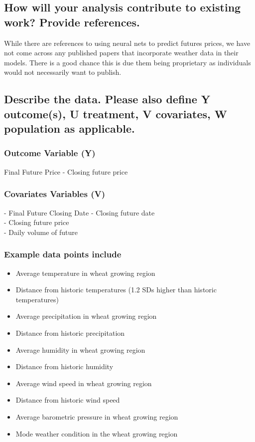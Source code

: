 \documentclass[twoside,11pt]{article}
\begin{document}
\subsection{How will your analysis contribute to existing work? Provide references.}

While there are references to using neural nets to predict futures prices, we have not come across any published papers that incorporate weather data in their models.  There is a good chance this is due them being proprietary as individuals would not necessarily want to publish.  


\subsection{Describe the data. Please also define Y outcome(s), U treatment, V covariates, W population as applicable.}

\subsubsection{Outcome Variable (Y)}
Final Future Price - Closing future price

\subsubsection{Covariates Variables (V)}

- Final Future Closing Date - Closing future date\\  
- Closing future price\\
- Daily volume of future

\subsubsection{Example data points include}
\begin{itemize}
  \item Average temperature in wheat growing region 
  \item Distance from historic temperatures (1.2 SDs higher than historic temperatures)
  \\
  \item Average precipitation in wheat growing region
  \item Distance from historic precipitation
  \\
  \item Average humidity in wheat growing region
  \item Distance from historic humidity
  \\
  \item Average wind speed in wheat growing region
  \item Distance from historic wind speed
  \\
  \item Average barometric pressure in wheat growing region
  \item Mode weather condition in the wheat growing region
\end{itemize}
\end{document}

